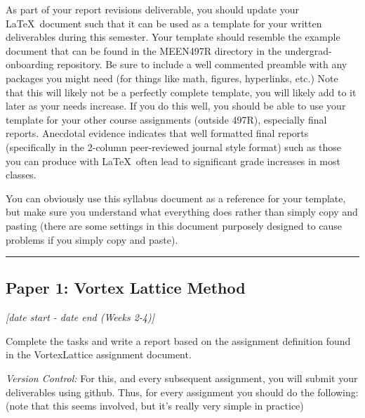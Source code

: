 \documentclass[12pt]{article}
\begin{document}
As part of your report revisions deliverable, you should update your \LaTeX~document such that it can be used as a template for your written deliverables during this semester.
Your template should resemble the example document that can be found in the MEEN497R directory in the undergrad-onboarding repository.
Be sure to include a well commented preamble with any packages you might need (for things like math, figures, hyperlinks, etc.)
Note that this will likely not be a perfectly complete template, you will likely add to it later as your needs increase.  If you do this well, you should be able to use your template for your other course assignments (outside 497R), especially final reports.  Anecdotal evidence indicates that well formatted final reports (specifically in the 2-column peer-reviewed journal style format) such as those you can produce with \LaTeX~often lead to significant grade increases in most classes.

You can obviously use this syllabus document as a reference for your template, but make sure you understand what everything does rather than simply copy and pasting (there are some settings in this document purposely designed to cause problems if you simply copy and paste).



\vspace{1em}\hrule\vspace{1em}
\subsection{Paper 1: Vortex Lattice Method}
\label{ssec:p1}
\textit{[date start - date end (Weeks 2-4)]}

\bigskip

Complete the tasks and write a report based on the assignment definition found in the VortexLattice assignment document.

\bigskip


\textit{Version Control:}
For this, and every subsequent assignment, you will submit your deliverables using github.  Thus, for every assignment you should do the following: (note that this seems involved, but it's really very simple in practice)
\end{document}
